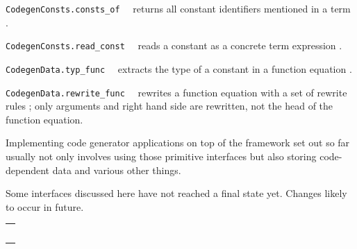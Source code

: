 \begin{isabellebody}
\begin{isamarkuptext}
\begin{description}
  \item \verb|CodegenConsts.consts_of|~~
     returns all constant identifiers mentioned in a term .

  \item \verb|CodegenConsts.read_const|~~
     reads a constant as a concrete term expression .

  \item \verb|CodegenData.typ_func|~~
     extracts the type of a constant in a function equation .

  \item \verb|CodegenData.rewrite_func|~~
     rewrites a function equation  with a set of rewrite
     rules ; only arguments and right hand side are rewritten,
     not the head of the function equation.

  \end{description}%
\end{isamarkuptext}%
\isamarkuptrue%
%
\endisatagmlref
{\isafoldmlref}%
%
\isadelimmlref
%
\endisadelimmlref
%
\isamarkuptrue%
%
\begin{isamarkuptext}%
Implementing code generator applications on top
  of the framework set out so far usually not only
  involves using those primitive interfaces
  but also storing code-dependent data and various
  other things.

  \begin{warn}
    Some interfaces discussed here have not reached
    a final state yet.
    Changes likely to occur in future.
  \end{warn}

  \fixme%
\end{isamarkuptext}%
\isamarkuptrue%
%
\isamarkuptrue%
%
\begin{isamarkuptext}%
\medskip
  \begin{tabular}{l}
  \isa{val\ name{\isacharcolon}\ string} \\
  \isa{type\ T} \\
  \isa{val\ empty{\isacharcolon}\ T} \\
  \isa{val\ merge{\isacharcolon}\ Pretty{\isachardot}pp\ {\isasymrightarrow}\ T\ {\isacharasterisk}\ T\ {\isasymrightarrow}\ T} \\
  \isa{val\ purge{\isacharcolon}\ theory\ option\ {\isasymrightarrow}\ CodegenConsts{\isachardot}const\ list\ option\ {\isasymrightarrow}\ T\ {\isasymrightarrow}\ T}
  \end{tabular}


\end{isamarkuptext}
\end{isabellebody}
